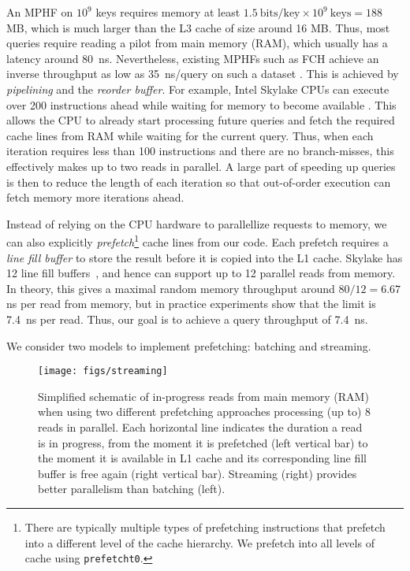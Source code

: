 \documentclass[a4paper,UKenglish,cleveref,thm-restate]{lipics-v2021}
\begin{document}
An MPHF on \(10^9\) keys requires memory at least \(1.5\mathrm{\ bits}/\mathrm{key} \times 10^9
\mathrm{\ keys} = 188\) MB, which is much larger than the L3 cache of size around
16 MB. Thus, most queries require reading a pilot from main memory (RAM), which usually
has a latency around 80~ns.
Nevertheless, existing MPHFs such as FCH \cite{fch} achieve an inverse throughput as
low as 35~ns/query on such a dataset \cite{pthash}.
This is achieved by \emph{pipelining} and the \emph{reorder buffer}.
For example, Intel Skylake CPUs can execute over 200 instructions ahead while waiting for memory
to become available \cite{measuring-rob,measuring-rob-skylake}. This allows the CPU to already start processing future
queries and fetch the required cache lines from RAM while waiting for the
current query. Thus, when each iteration requires less than 100 instructions
and there are no branch-misses, this effectively makes up to two reads in
parallel. A large part of speeding up queries is then to reduce the length of
each iteration so that out-of-order execution can fetch memory more iterations ahead.

Instead of relying on the CPU hardware to parallellize requests to memory, we can also
explicitly \emph{prefetch}\footnote{There are typically multiple types of prefetching
instructions that prefetch into a different level of the cache hierarchy. We
prefetch into all levels of cache using \texttt{prefetcht0}.} cache lines from our code.
Each prefetch requires a \emph{line fill buffer} to store the result before it is
copied into the L1 cache. Skylake has 12 line fill buffers~\cite{line-fill-buffer-skylake}, and hence can support up to 12 parallel
reads from memory.
In theory, this gives a maximal random memory throughput around $80/12 = 6.67$ ns per read
from memory, but in practice experiments show that the limit is 7.4~ns per read.
Thus, our goal is to achieve a query throughput of 7.4~ns.

We consider two models to implement prefetching: batching and streaming.

\begin{figure}[b]
\centering
\texttt{[image: figs/streaming]}
\caption{\label{streaming}Simplified schematic of in-progress reads from main memory (RAM) when using two different prefetching approaches processing (up to) \(8\) reads in parallel. Each horizontal line indicates the duration a read is in progress, from the moment it is prefetched (left vertical bar) to the moment it is available in L1 cache and its corresponding line fill buffer is free again (right vertical bar). Streaming (right) provides better parallelism than batching (left).}
\end{figure}
\end{document}
